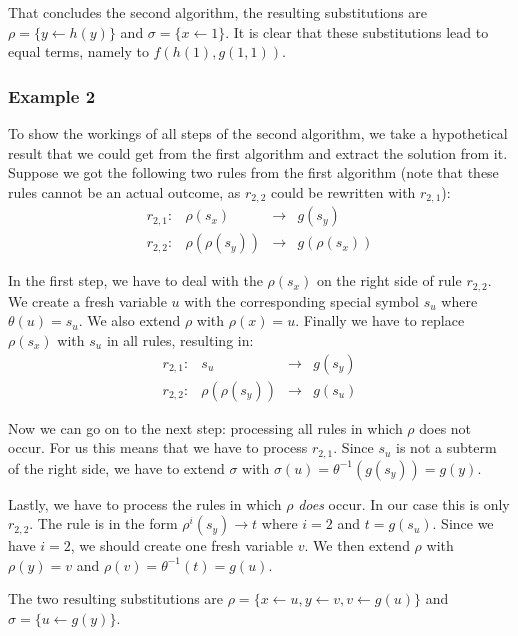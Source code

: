 That concludes the second algorithm, the resulting substitutions are $\rho = \{ y \leftarrow h(y) \}$ and $\sigma = \{ x \leftarrow 1 \}$. It is clear that these substitutions lead to equal terms, namely to $f(h(1), g(1, 1))$. 

\subsubsection*{Example 2}
To show the workings of all steps of the second algorithm, we take a hypothetical result that we could get from the first algorithm and extract the solution from it. Suppose we got the following two rules from the first algorithm (note that these rules cannot be an actual outcome, as $r_{2,2}$ could be rewritten with $r_{2,1}$):
$$
\begin{array}{lrcl}
    r_{2,1}: & \rho(s_x) & \rightarrow & g(s_y) \\
    r_{2,2}: & \rho(\rho(s_y)) & \rightarrow & g(\rho(s_x))
\end{array}
$$

In the first step, we have to deal with the $\rho(s_x)$ on the right side of rule $r_{2,2}$. We create a fresh variable $u$ with the corresponding special symbol $s_u$ where $\theta(u) = s_u$. We also extend $\rho$ with $\rho(x) = u$. Finally we have to replace $\rho(s_x)$ with $s_u$ in all rules, resulting in:
$$
\begin{array}{lrcl}
    r_{2,1}: & s_u & \rightarrow & g(s_y) \\
    r_{2,2}: & \rho(\rho(s_y)) & \rightarrow & g(s_u)
\end{array}
$$

Now we can go on to the next step: processing all rules in which $\rho$ does not occur. For us this means that we have to process $r_{2,1}$. Since $s_u$ is not a subterm of the right side, we have to extend $\sigma$ with $\sigma(u) = \theta^{-1}(g(s_y)) = g(y)$. 

Lastly, we have to process the rules in which $\rho$ \textit{does} occur. In our case this is only $r_{2,2}$. The rule is in the form $\rho^i(s_y) \rightarrow t$ where $i = 2$ and $t = g(s_u)$. Since we have $i = 2$, we should create one fresh variable $v$. We then extend $\rho$ with $\rho(y) = v$ and $\rho(v) = \theta^{-1}(t) = g(u)$. 

The two resulting substitutions are $\rho = \{ x \leftarrow u, y \leftarrow v, v \leftarrow g(u) \}$ and $\sigma = \{ u \leftarrow g(y) \}$.